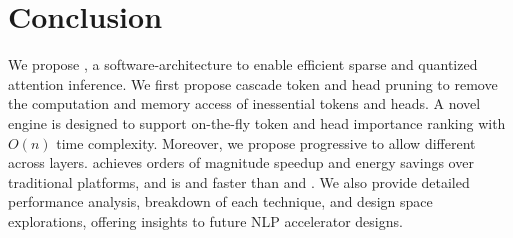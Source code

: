 \section{Conclusion}

 We propose \name, a software-architecture \codesign to enable efficient sparse and quantized attention inference.
 We first propose cascade token and head pruning to remove the computation and memory access of inessential tokens and heads. 
 A novel \topk engine is designed to support on-the-fly token and head importance ranking with $O(n)$ time complexity. Moreover, we propose progressive \lowprec to allow different \bitwidths across layers. 
 \name achieves orders of magnitude speedup and energy savings over traditional platforms, and is \perfoverathree\x and \perfovermnnfast\x faster than \athree and \mnnfast. We also provide detailed performance analysis, breakdown of each technique, and design space explorations, offering insights to future NLP accelerator designs.
 